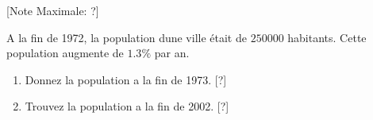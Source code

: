 \begin{question}
  \hspace*{\fill} [Note Maximale: ?]\par
  \noindent A la fin de 1972, la population dune ville était de $250 000$ habitants.  Cette population augmente de $1.3\%$ par an.\par
  \medskip
  \begin{enumerate}[label=(\alph*)]
     \item Donnez la population a la fin de 1973.\hspace*{\fill} [?]
     \item Trouvez la population a la fin de 2002.\hspace*{\fill} [?]
  \end{enumerate}
\end{question}
